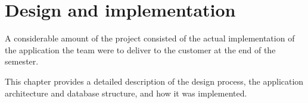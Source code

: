 \chapter{Design and implementation}

A considerable amount of the project consisted of the actual implementation of the application the team were to deliver to the customer at the end of the semester. 

This chapter provides a detailed description of the design process, the application architecture and database structure, and how it was implemented.




